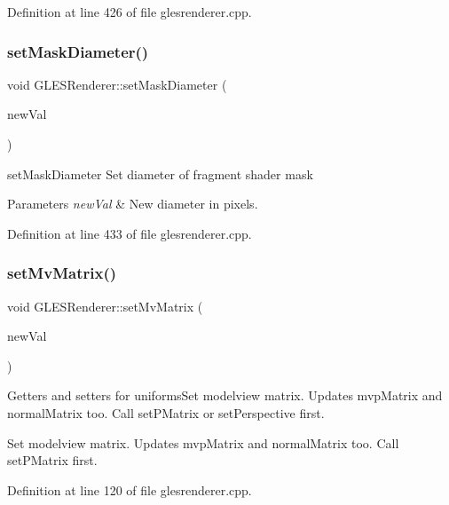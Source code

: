Definition at line 426 of file glesrenderer.\+cpp.

\mbox{\label{class_g_l_e_s_renderer_a07c9bfdc4f16745e9b09529e21184910}} 
\subsubsection{\texorpdfstring{setMaskDiameter()}{setMaskDiameter()}}
{\footnotesize\ttfamily void G\+L\+E\+S\+Renderer\+::set\+Mask\+Diameter (\begin{DoxyParamCaption}\item[{float}]{new\+Val }\end{DoxyParamCaption})}



set\+Mask\+Diameter Set diameter of fragment shader mask 


\begin{DoxyParams}{Parameters}
{\em new\+Val} & New diameter in pixels. \\
\hline
\end{DoxyParams}


Definition at line 433 of file glesrenderer.\+cpp.

\mbox{\label{class_g_l_e_s_renderer_a8242d0b241a14c5850867ec00819c014}} 
\subsubsection{\texorpdfstring{setMvMatrix()}{setMvMatrix()}}
{\footnotesize\ttfamily void G\+L\+E\+S\+Renderer\+::set\+Mv\+Matrix (\begin{DoxyParamCaption}\item[{const Q\+Matrix4x4}]{new\+Val }\end{DoxyParamCaption})}

Getters and setters for uniforms\+Set modelview matrix. Updates mvp\+Matrix and normal\+Matrix too. Call set\+P\+Matrix or set\+Perspective first.

Set modelview matrix. Updates mvp\+Matrix and normal\+Matrix too. Call set\+P\+Matrix first. 

Definition at line 120 of file glesrenderer.\+cpp.

